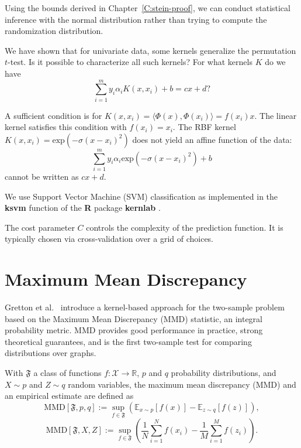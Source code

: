 Using the bounds derived in Chapter~\ref{C:stein-proof}, we can
conduct statistical inference with the normal distribution rather than
trying to compute the randomization distribution.

We have shown that for univariate data, some kernels generalize the
permutation $t$-test.  Is it possible to characterize all such kernels?
For what kernels $K$ do we have
\begin{equation}
\sum_{i=1}^m y_i \alpha_i K(x, x_i) + b = cx + d?
\end{equation}

A sufficient condition is for $K(x, x_i) = \langle \Phi(x), \Phi(x_i) \rangle =
f(x_i) x$.  The linear kernel satisfies this condition with $f(x_i) =
x_i$.  The RBF kernel $K(x, x_i) = \text{exp}(-\sigma (x-x_i)^2)$ does
not yield an affine function of the data:
\begin{equation}
\sum_{i=1}^m y_i \alpha_i \text{exp}(-\sigma (x-x_i)^2) + b
\end{equation}
cannot be written as $cx + d$.

We use Support Vector Machine (SVM) classification
as implemented in the {\bf ksvm} function of the {\bf R}
\cite{cran} package {\bf kernlab} \cite{kernlab}.

The cost parameter $C$ controls the complexity of the prediction
function. It is typically chosen via cross-validation over a grid
of choices.

\section{Maximum Mean Discrepancy}
Gretton et al.\ \cite{gretton19m, gretton2010fast, gretton2012kernel,
  borgwardt2006integrating} introduce a kernel-based approach for
the two-sample problem based on the Maximum Mean Discrepancy (MMD)
statistic, an integral probability metric.  MMD provides good
performance in practice, strong theoretical guarantees, and is the
first two-sample test for comparing distributions over graphs.

\begin{definition}
  With $\mathfrak{F}$ a class of functions $f:\mathcal{X} \to
  \mathbb{R}$, $p$ and $q$ probability distributions, and $X \sim p$
  and $Z \sim q$ random variables, the maximum mean discrepancy (MMD)
  and an empirical estimate are defined as
  \begin{equation*}
    \text{MMD}[\mathfrak{F},p,q] := \sup_{f\in
      \mathfrak{F}}(\mathbb{E}_{x\sim p}[f(x)] - \mathbb{E}_{z\sim q}[f(z)]),
  \end{equation*}
  \begin{equation*}
    \text{MMD}[\mathfrak{F},X,Z] := \sup_{f\in
      \mathfrak{F}}\left (\frac{1}{N}\sum_{i=1}^Nf(x_i) -
    \frac{1}{M}\sum_{i=1}^M f(z_i) \right ).
  \end{equation*}
\end{definition}

